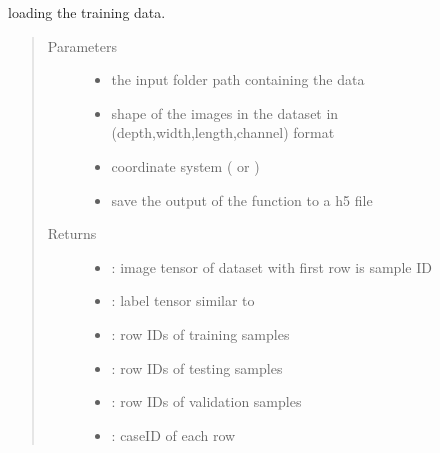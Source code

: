 \documentclass[letterpaper,10pt,english]{sphinxmanual}
\begin{document}
\begin{fulllineitems}
\label{\detokenize{index:util.load_data.load_train_data}}
loading the training data.
\begin{quote}\begin{description}
\item[{Parameters}] \leavevmode\begin{itemize}
\item {} 
 \textendash{} the input folder path containing the data

\item {} 
 \textendash{} shape of the images in the dataset in (depth,width,length,channel) format

\item {} 
 \textendash{} coordinate system ( or )

\item {} 
 \textendash{} save the output of the function to a h5 file

\end{itemize}

\item[{Returns}] \leavevmode
\begin{itemize}
\item {} 
: image tensor of dataset with first row is sample ID

\item {} 
: label tensor similar to 

\item {} 
: row IDs of training samples

\item {} 
: row IDs of testing samples

\item {} 
: row IDs of validation samples

\item {} 
: caseID of each row

\end{itemize}


\end{description}\end{quote}




{\hyperref[\detokenize{index:util.load_data.make_dataset}]{}}



\end{fulllineitems}
\end{document}

